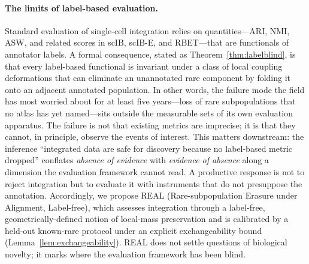 
\paragraph*{The limits of label-based evaluation.}
Standard evaluation of single-cell integration relies on quantities---$\mathrm{ARI}$, $\mathrm{NMI}$, $\mathrm{ASW}$, and related scores in scIB, scIB-E, and RBET---that are functionals of annotator labels. A formal consequence, stated as Theorem~\ref{thm:labelblind}, is that every label-based functional is invariant under a class of local coupling deformations that can eliminate an unannotated rare component by folding it onto an adjacent annotated population. In other words, the failure mode the field has most worried about for at least five years---loss of rare subpopulations that no atlas has yet named---sits outside the measurable sets of its own evaluation apparatus. The failure is not that existing metrics are imprecise; it is that they cannot, in principle, observe the events of interest. This matters downstream: the inference ``integrated data are safe for discovery because no label-based metric dropped'' conflates \emph{absence of evidence} with \emph{evidence of absence} along a dimension the evaluation framework cannot read. A productive response is not to reject integration but to evaluate it with instruments that do not presuppose the annotation. Accordingly, we propose REAL (Rare-subpopulation Erasure under Alignment, Label-free), which assesses integration through a label-free, geometrically-defined notion of local-mass preservation and is calibrated by a held-out known-rare protocol under an explicit exchangeability bound (Lemma~\ref{lem:exchangeability}). REAL does not settle questions of biological novelty; it marks where the evaluation framework has been blind.
